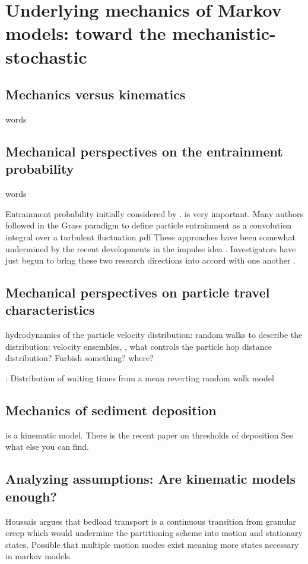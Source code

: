 \section{Underlying mechanics of Markov models: toward the mechanistic-stochastic} 
\subsection*{Mechanics versus kinematics} 
words

\subsection*{Mechanical perspectives on the entrainment probability} 
words

Entrainment probability initially considered by \citet{Einstein1942, Einstein1950}. 
\citet{Grass1970} is very important. 
Many authors followed in the Grass paradigm to define particle entrainment as a convolution integral over a turbulent fluctuation pdf \citep{Paintal1971, Kirchener1990, Ling1995, Laursen1999, Wu2002b, Wu2004a, Wu2003, Papanicolaou2002, Bridge1992, Kirchener1990, Ma2013, Nakagawa1980, Vanrijn1984}
These approaches have been somewhat undermined by the recent developments in the impulse idea \citep{Diplas2008, Valyrakis2011, Valyrakis2013, Celik2014}. 
Investigators have just begun to bring these two research directions into accord with one another \citep{Tregnaghi2012, Dey2018}.

\subsection*{Mechanical perspectives on particle travel characteristics}

hydrodynamics of the particle velocity distribution: 
random walks to describe the distribution: \citep{Ancey2008, Fan2014}
velocity ensembles, \citep{Furbish2012b}, \citep{Furbish2013} 
what controls the particle hop distance distribution? 
Furbish something? where? \citep{Furbish2016} 

\citet{Martin2014}: Distribution of waiting times from a mean reverting random walk model


\subsection*{Mechanics of sediment deposition} 
\citep{Charru2004} is a kinematic model. 
There is the recent paper on thresholds of deposition
See what else you can find.


\subsection*{Analyzing assumptions: Are kinematic models enough?}
Houssais argues that bedload transport is a continuous transition from granular creep which would undermine the
partitioning scheme into motion and stationary states.
Possible that multiple motion modes exist meaning more states necessary in markov models.

